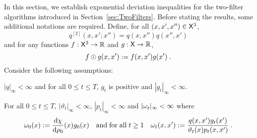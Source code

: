 \label{sec:ExponentialTwoFilters}
In this section, we establish exponential deviation inequalities for  the two-filter algorithms introduced in Section~\ref{sec:TwoFilters}. Before stating the results, some additional notations are required. Define, for all $(x,x',x'') \in \mathsf{X}^3$,
\begin{equation*}
q^{[2]}(x,x';x'') = q(x,x'') q(x'',x')
\end{equation*}
and for any functions $f: \mathsf{X}^2 \to \mathbb{R}$ and $g: \mathsf{X} \to \mathbb{R}$,
\[
f \odot g(x,x') := f(x,x') g(x')\;.
\]
Consider the following assumptions:
\begin{assumptionA}
\label{assum:bound-likelihood}
$|q|_{\infty}<\infty$ and for all $0\le t \le T$, $g_t$ is positive and $|g_t|_{\infty}<\infty$.
\end{assumptionA}

\begin{assumptionA}
\label{assum:borne-FFBS}
For all $0\le t \le T$, $|\vartheta_t|_{\infty} < \infty$, $|p_t|_{\infty} < \infty$ and $|\omega_{t}^{}|_{\infty} < \infty$ where
    \begin{equation*}
    \omega_0(x) := \dfrac{\mathrm{d}\chi}{\mathrm{d}\rho_0}(x)g_{0}(x)
    \quad\mbox{and\;for\;all\;}t\ge 1\quad
    \omega_t(x,x^{\prime}) := \dfrac{q(x,x^{\prime})g_{t}(x')}{\vartheta_t(x)p_t(x,x^{\prime})}\;.
    \end{equation*}
\end{assumptionA}


